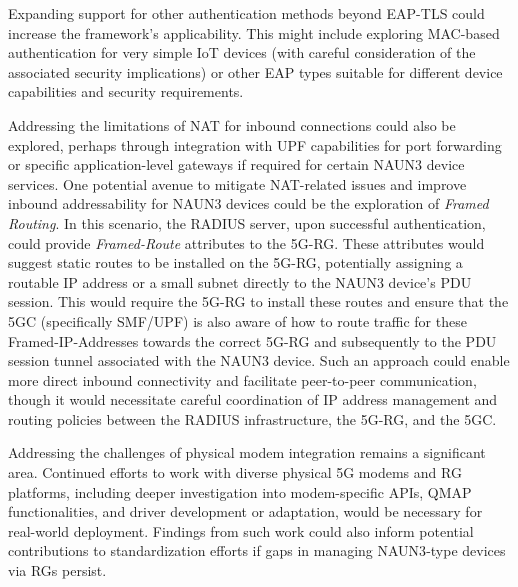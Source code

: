 Expanding support for other authentication methods beyond \ac{EAP-TLS} could increase the framework's applicability. This might include exploring \ac{MAC}-based authentication for very simple \ac{IoT} devices (with careful consideration of the associated security implications) or other \ac{EAP} types suitable for different device capabilities and security requirements.

Addressing the limitations of NAT for inbound connections could also be explored, perhaps through integration with \ac{UPF} capabilities for port forwarding or specific application-level gateways if required for certain \ac{NAUN3} device services. One potential avenue to mitigate \ac{NAT}-related issues and improve inbound addressability for \ac{NAUN3} devices could be the exploration of \textit{Framed Routing}. In this scenario, the RADIUS server, upon successful authentication, could provide \textit{Framed-Route} attributes to the \ac{5G-RG}. These attributes would suggest static routes to be installed on the \ac{5G-RG}, potentially assigning a routable \ac{IP} address or a small subnet directly to the \ac{NAUN3} device's \ac{PDU} session. This would require the \ac{5G-RG} to install these routes and ensure that the \ac{5GC} (specifically \ac{SMF}/\ac{UPF}) is also aware of how to route traffic for these Framed-IP-Addresses towards the correct \ac{5G-RG} and subsequently to the \ac{PDU} session tunnel associated with the \ac{NAUN3} device. Such an approach could enable more direct inbound connectivity and facilitate peer-to-peer communication, though it would necessitate careful coordination of \ac{IP} address management and routing policies between the \ac{RADIUS} infrastructure, the \ac{5G-RG}, and the \ac{5GC}.

Addressing the challenges of physical modem integration remains a significant area. Continued efforts to work with diverse physical \ac{5G} modems and \ac{RG} platforms, including deeper investigation into modem-specific \acp{API}, \ac{QMAP} functionalities, and driver development or adaptation, would be necessary for real-world deployment. Findings from such work could also inform potential contributions to standardization efforts if gaps in managing \ac{NAUN3}-type devices via \acp{RG} persist.

